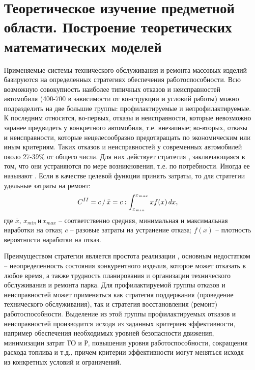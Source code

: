 \documentclass[../nirs.tex]{subfiles}
\begin{document}
\section{Теоретическое изучение предметной области. Построение теоретических
математических моделей}

Применяемые системы технического обслуживания и ремонта массовых изделий
базируются на определенных стратегиях обеспечения работоспособности. Всю
возможную совокупность наиболее типичных отказов и неисправностей автомобиля
(400-700 в зависимости от конструкции и условий работы) можно подразделить на
две большие группы: профилактируемые и непрофилактируемые. К последним
относятся, во-первых, отказы и неисправности, которые невозможно заранее
предвидеть у конкретного автомобиля, т.е. внезапные; во-вторых, отказы и
неисправности, которые нецелесообразно предотвращать по экономическим или иным
критериям. Таких отказов и неисправностей у современных автомобилей около
27-39\% от общего числа. Для них действует стратегия , заключающаяся в
том, что они устраняются по мере возникновения, т.е. по потребности. Иногда ее
называют . Если в качестве целевой
функции принять затраты, то для стратегии  удельные затраты на ремонт:
\begin{equation*}
    C^{\rom{2}} =
    c\,/\,\bar{x} =
    c : \int_{x_{min}}^{x_{max}} x f(x)\,dx,
\end{equation*}
где $\bar{x},\,x_{min} \,\text{и} \,x_{max}$ -- соответственно средняя,
минимальная и максимальная наработки на отказ; $c$ -- разовые затраты на
устранение отказа; $f(x)$ -- плотность вероятности наработки на отказ.

Преимуществом стратегии  является простота реализации , основным
недостатком -- неопределенность состояния конкурентного изделия, которое может
отказать в любое время, а также трудность планирования и организации
технического обслуживания и ремонта парка. Для профилактируемой группы отказов и
неисправностей может применяться как стратегия поддержания (проведение
технического обслуживания), так и стратегия восстановления (ремонт)
работоспособности. Выделение из этой группы профилактируемых отказов и
неисправностей производится исходя из заданных критериев эффективности, например
обеспечения необходимых уровней безопасности движения, минимизации затрат ТО и
Р, повышения уровня работоспособности, сокращения расхода топлива и т.д., причем
критерии эффективности могут меняться исходя из конкретных условий и
ограничений.
\end{document}
